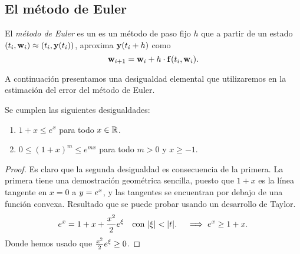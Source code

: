 \subsection{El método de Euler}

\begin{method}\label{met:euler}
    El \emph{método de Euler} es un es un método de paso fijo $h$ que
    a partir de un estado $(t_i, \vb{w}_i) \approx (t_i, \vb{y}(t_i))$,
    aproxima $\vb{y}(t_i + h)$ como
    \begin{equation*}
        \vb{w}_{i+1} = \vb{w}_i + h\cdot \vb{f}(t_i, \vb{w}_i).
    \end{equation*}
\end{method}

A continuación presentamos una desigualdad elemental que utilizaremos
en la estimación del error del método de Euler.

\begin{lemma}\label{lma:tangent-exponential}
    Se cumplen las siguientes desigualdades:
    \begin{enumerate}
        \item $1 + x \le e^x$ para todo $x \in \mathbb{R}$.
        \item $0 \le (1+x)^m \le e^{mx}$ para todo $m > 0$ y $x \ge -1$.
    \end{enumerate} 
\end{lemma}

\begin{proof}
    Es claro que la segunda desigualdad es consecuencia de la primera.
    La primera tiene una demostración geométrica sencilla,
    puesto que $1 + x$ es la línea tangente en $x = 0$ a $y = e^x$,
    y las tangentes se encuentran por debajo de una función convexa.
    Resultado que se puede probar usando un desarrollo de Taylor.
    \begin{equation*}
        \nume^x = 1 + x + \frac{x^2}{2}\nume^\xi \qq{con $\abs{\xi} < \abs{t}.$}
        \implies \nume^x \ge 1+ x.
    \end{equation*}
    Donde hemos usado que $\frac{x^2}{2}e^\xi \ge 0$.
\end{proof}

